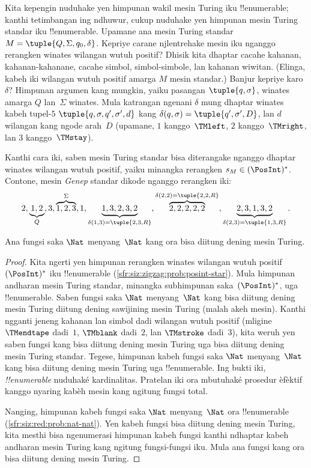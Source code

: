 \documentclass[../../../include/open-logic-section]{subfiles}
\begin{document}
\begin{explain}
Kita kepengin nuduhake yen himpunan wakil mesin Turing iku
!!{enumerable}; kanthi tetimbangan ing ndhuwur, cukup
nuduhake yen himpunan mesin Turing standar iku
!!{enumerable}. Upamane ana mesin Turing standar
$M = \tuple{Q, \Sigma, q_0, \delta}$. Kepriye carane
njlentrehake mesin iku nganggo rerangken winates
wilangan wutuh positif? Dhisik kita dhaptar cacahe
kahanan, kahanan-kahanane, cacahe simbol, simbol-simbole,
lan kahanan wiwitan. (Elinga, kabeh iki wilangan
wutuh positif amarga $M$ mesin standar.) Banjur
kepriye karo~$\delta$? Himpunan argumen kang mungkin,
yaiku pasangan $\tuple{q,\sigma}$, winates amarga
$Q$ lan~$\Sigma$ winates. Mula katrangan ngenani
$\delta$ mung dhaptar winates kabeh tupel-$5$
$\tuple{q, \sigma, q', \sigma', d}$ kang
$\delta(q,\sigma) = \tuple{q', \sigma', D}$, lan
$d$ wilangan kang ngode arah~$D$ (upamane,
$1$ kanggo~$\TMleft$, $2$ kanggo~$\TMright$,
lan $3$ kanggo~$\TMstay$).

Kanthi cara iki, saben mesin Turing standar bisa
diterangake nganggo dhaptar winates wilangan
wutuh positif, yaiku minangka rerangken $s_M \in
(\PosInt)^*$. Contone, mesin \emph{Genep} standar
dikode nganggo rerangken iki:
\[
2, \underbrace{1, 2}_Q, 3, \overbrace{1, 2, 3}^\Sigma, 1, \underbrace{1, 3, 2, 3, 2}_{\delta(1,3) = \tuple{2,3,R}}, 
\overbrace{2, 2, 2, 2, 2}^{\delta(2,2) = \tuple{2,2,R}},
\underbrace{2, 3, 1, 3, 2}_{\delta(2,3) = \tuple{1,3,R}}.
\]
\end{explain}

\begin{thm}
Ana fungsi saka $\Nat$ menyang~$\Nat$ kang
ora bisa diitung dening mesin Turing.
\end{thm}

\begin{proof}
Kita ngerti yen himpunan rerangken winates wilangan
wutuh positif~$(\PosInt)^*$ iku !!{enumerable}
(\cref{sfr:siz:zigzag:prob:posint-star}). Mula
himpunan andharan mesin Turing standar, minangka
subhimpunan saka~$(\PosInt)^*$, uga
!!{enumerable}. Saben fungsi saka $\Nat$ menyang~$\Nat$
kang bisa diitung dening mesin Turing diitung
dening sawijining mesin Turing (malah akeh mesin).
Kanthi ngganti jeneng kahanan lan simbol dadi
wilangan wutuh positif (mligine $\TMendtape$
dadi~$1$, $\TMblank$ dadi~$2$, lan $\TMstroke$
dadi~$3$), kita weruh yen saben fungsi kang
bisa diitung dening mesin Turing uga bisa
diitung dening mesin Turing standar. Tegese,
himpunan kabeh fungsi saka $\Nat$ menyang~$\Nat$
kang bisa diitung dening mesin Turing uga
!!{enumerable}. Ing bukti iki, \emph{!!{enumerable}} nuduhaké kardinalitas.
Pratelan iki ora mbutuhaké prosedur èfèktif kanggo nyaring kabèh
mesin kang ngitung fungsi total.

Nanging, himpunan kabeh fungsi saka $\Nat$
menyang~$\Nat$ ora !!{enumerable}
(\cref{sfr:siz:red:prob:nat-nat}). Yen kabeh
fungsi bisa diitung dening mesin Turing,
kita mesthi bisa ngenumerasi himpunan kabeh
fungsi kanthi ndhaptar kabeh andharan mesin
Turing kang ngitung fungsi-fungsi iku. Mula
ana fungsi kang ora bisa diitung dening
mesin Turing.
\end{proof}
\end{document}
